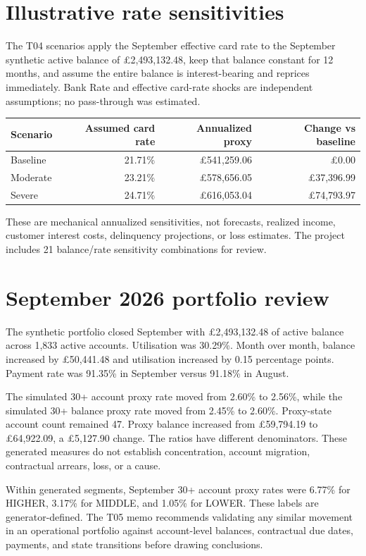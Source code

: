\documentclass[11pt]{article}
\begin{document}
\section{Illustrative rate sensitivities}

The T04 scenarios apply the September effective card rate to the September synthetic active balance of £2,493,132.48, keep that balance constant for 12 months, and assume the entire balance is interest-bearing and reprices immediately. Bank Rate and effective card-rate shocks are independent assumptions; no pass-through was estimated.

\begin{center}
\begin{tabular}{lrrr}
\toprule
Scenario & Assumed card rate & Annualized proxy & Change vs baseline \\
\midrule
Baseline & 21.71\% & £541,259.06 & £0.00 \\
Moderate & 23.21\% & £578,656.05 & £37,396.99 \\
Severe & 24.71\% & £616,053.04 & £74,793.97 \\
\bottomrule
\end{tabular}
\end{center}

These are mechanical annualized sensitivities, not forecasts, realized income, customer interest costs, delinquency projections, or loss estimates. The project includes 21 balance/rate sensitivity combinations for review.

\section{September 2026 portfolio review}

The synthetic portfolio closed September with £2,493,132.48 of active balance across 1,833 active accounts. Utilisation was 30.29\%. Month over month, balance increased by £50,441.48 and utilisation increased by 0.15 percentage points. Payment rate was 91.35\% in September versus 91.18\% in August.

The simulated 30+ account proxy rate moved from 2.60\% to 2.56\%, while the simulated 30+ balance proxy rate moved from 2.45\% to 2.60\%. Proxy-state account count remained 47. Proxy balance increased from £59,794.19 to £64,922.09, a £5,127.90 change. The ratios have different denominators. These generated measures do not establish concentration, account migration, contractual arrears, loss, or a cause.

Within generated segments, September 30+ account proxy rates were 6.77\% for HIGHER, 3.17\% for MIDDLE, and 1.05\% for LOWER. These labels are generator-defined. The T05 memo recommends validating any similar movement in an operational portfolio against account-level balances, contractual due dates, payments, and state transitions before drawing conclusions.
\end{document}
